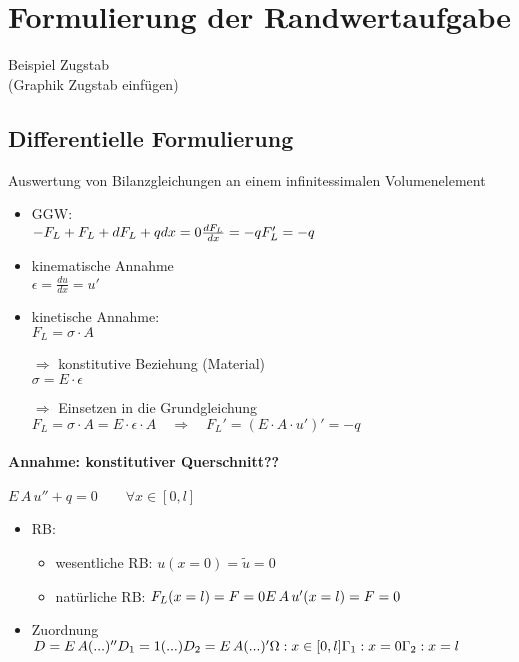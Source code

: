 \section{Formulierung der Randwertaufgabe}
Beispiel Zugstab\\
(Graphik Zugstab einfügen)\\
\subsection{Differentielle Formulierung}
Auswertung von Bilanzgleichungen an einem infinitessimalen Volumenelement\\
\begin{itemize}
\item GGW: \\\(-F_L + F_L + dF_L + qdx = 0 \\\\ \frac{dF_L}{dx} = -q \\\\ F_L' = -q\)
\item kinematische Annahme\\
	\(\epsilon = \frac{du}{dx} = u'\)
\item kinetische Annahme:\\
	\(F_L = \sigma \cdot A \)
\item[$\Rightarrow$] konstitutive Beziehung (Material)\\
	\(\sigma = E \cdot \epsilon\)
\item[$\Rightarrow$] Einsetzen in die Grundgleichung\\
	\(F_L = \sigma \cdot A = E \cdot \epsilon \cdot A \quad \Rightarrow \quad F_L' = (E \cdot A \cdot u')' = -q\)
\end{itemize}
\paragraph{Annahme: konstitutiver Querschnitt??}
\(E\,A\,u'' + q = 0 \qquad \forall x \in [0,l]\)

\begin{itemize}
	\item RB: 
		\begin{itemize}
		\item wesentliche RB: \(u(x=0) = \tilde{u} = 0 \)
		\item natürliche RB: \(F_L (x=l) = F = 0 \\ E\,A\,u' (x=l) = F = 0\)
		\end{itemize}
	\item Zuordnung \\
			\(D = E\,A (...)'' \\
			D_1 = 1 (...) \\
			D_2 = E\,A(...)' \\
			\Omega : x \in [0, l] \\
			\Gamma_1 : x = 0 \\
			\Gamma_2 : x = l \)
\end{itemize}


